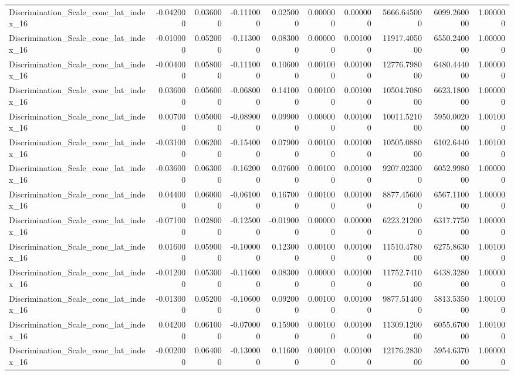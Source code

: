 \begin{table}
\begin{tabular}{lrrrrrrrrr}
Discrimination_Scale_conc_lat_index_16 & -0.042000 & 0.036000 & -0.111000 & 0.025000 & 0.000000 & 0.000000 & 5666.645000 & 6099.260000 & 1.000000 \\
Discrimination_Scale_conc_lat_index_16 & -0.010000 & 0.052000 & -0.113000 & 0.083000 & 0.000000 & 0.001000 & 11917.405000 & 6550.240000 & 1.000000 \\
Discrimination_Scale_conc_lat_index_16 & -0.004000 & 0.058000 & -0.111000 & 0.106000 & 0.001000 & 0.001000 & 12776.798000 & 6480.444000 & 1.000000 \\
Discrimination_Scale_conc_lat_index_16 & 0.036000 & 0.056000 & -0.068000 & 0.141000 & 0.001000 & 0.001000 & 10504.708000 & 6623.180000 & 1.000000 \\
Discrimination_Scale_conc_lat_index_16 & 0.007000 & 0.050000 & -0.089000 & 0.099000 & 0.000000 & 0.001000 & 10011.521000 & 5950.002000 & 1.001000 \\
Discrimination_Scale_conc_lat_index_16 & -0.031000 & 0.062000 & -0.154000 & 0.079000 & 0.001000 & 0.001000 & 10505.088000 & 6102.644000 & 1.001000 \\
Discrimination_Scale_conc_lat_index_16 & -0.036000 & 0.063000 & -0.162000 & 0.076000 & 0.001000 & 0.001000 & 9207.023000 & 6052.998000 & 1.000000 \\
Discrimination_Scale_conc_lat_index_16 & 0.044000 & 0.060000 & -0.061000 & 0.167000 & 0.001000 & 0.001000 & 8877.456000 & 6567.110000 & 1.000000 \\
Discrimination_Scale_conc_lat_index_16 & -0.071000 & 0.028000 & -0.125000 & -0.019000 & 0.000000 & 0.000000 & 6223.212000 & 6317.775000 & 1.000000 \\
Discrimination_Scale_conc_lat_index_16 & 0.016000 & 0.059000 & -0.100000 & 0.123000 & 0.001000 & 0.001000 & 11510.478000 & 6275.863000 & 1.001000 \\
Discrimination_Scale_conc_lat_index_16 & -0.012000 & 0.053000 & -0.116000 & 0.083000 & 0.000000 & 0.001000 & 11752.741000 & 6438.328000 & 1.000000 \\
Discrimination_Scale_conc_lat_index_16 & -0.013000 & 0.052000 & -0.106000 & 0.092000 & 0.001000 & 0.001000 & 9877.514000 & 5813.535000 & 1.001000 \\
Discrimination_Scale_conc_lat_index_16 & 0.042000 & 0.061000 & -0.070000 & 0.159000 & 0.001000 & 0.001000 & 11309.120000 & 6055.670000 & 1.001000 \\
Discrimination_Scale_conc_lat_index_16 & -0.002000 & 0.064000 & -0.130000 & 0.116000 & 0.001000 & 0.001000 & 12176.283000 & 5954.637000 & 1.000000 \\

\end{tabular}
\end{table}

